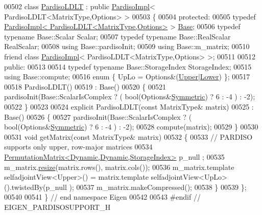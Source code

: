 \begin{DoxyCode}
00502 \textcolor{keyword}{class }\hyperlink{class_eigen_1_1_pardiso_l_d_l_t}{PardisoLDLT} : \textcolor{keyword}{public} \hyperlink{class_eigen_1_1_pardiso_impl}{PardisoImpl}< PardisoLDLT<MatrixType,Options> >
00503 \{
00504   \textcolor{keyword}{protected}:
00505     \textcolor{keyword}{typedef} \hyperlink{class_eigen_1_1_pardiso_impl}{PardisoImpl< PardisoLDLT<MatrixType,Options>} > 
      \hyperlink{group___sparse_core___module}{Base};
00506     \textcolor{keyword}{typedef} \textcolor{keyword}{typename} Base::Scalar Scalar;
00507     \textcolor{keyword}{typedef} \textcolor{keyword}{typename} Base::RealScalar RealScalar;
00508     \textcolor{keyword}{using} Base::pardisoInit;
00509     \textcolor{keyword}{using} Base::m\_matrix;
00510     \textcolor{keyword}{friend} \textcolor{keyword}{class }\hyperlink{class_eigen_1_1_pardiso_impl}{PardisoImpl}< PardisoLDLT<MatrixType,Options> >;
00511 
00512   \textcolor{keyword}{public}:
00513 
00514     \textcolor{keyword}{typedef} \textcolor{keyword}{typename} Base::StorageIndex StorageIndex;
00515     \textcolor{keyword}{using} Base::compute;
00516     \textcolor{keyword}{enum} \{ UpLo = Options&(\hyperlink{group__enums_gga39e3366ff5554d731e7dc8bb642f83cda6bcb58be3b8b8ec84859ce0c5ac0aaec}{Upper}|\hyperlink{group__enums_gga39e3366ff5554d731e7dc8bb642f83cda891792b8ed394f7607ab16dd716f60e6}{Lower}) \};
00517 
00518     PardisoLDLT()
00519       : Base()
00520     \{
00521       pardisoInit(Base::ScalarIsComplex ? ( \textcolor{keywordtype}{bool}(Options&\hyperlink{group__enums_gga39e3366ff5554d731e7dc8bb642f83cda7d30fb969ef6b763c098f0015108cef4}{Symmetric}) ? 6 : -4 ) : -2);
00522     \}
00523 
00524     \textcolor{keyword}{explicit} PardisoLDLT(\textcolor{keyword}{const} MatrixType& matrix)
00525       : Base()
00526     \{
00527       pardisoInit(Base::ScalarIsComplex ? ( \textcolor{keywordtype}{bool}(Options&\hyperlink{group__enums_gga39e3366ff5554d731e7dc8bb642f83cda7d30fb969ef6b763c098f0015108cef4}{Symmetric}) ? 6 : -4 ) : -2);
00528       compute(matrix);
00529     \}
00530     
00531     \textcolor{keywordtype}{void} getMatrix(\textcolor{keyword}{const} MatrixType& matrix)
00532     \{
00533       \textcolor{comment}{// PARDISO supports only upper, row-major matrices}
00534       \hyperlink{group___core___module}{PermutationMatrix<Dynamic,Dynamic,StorageIndex>} p\_null
      ;
00535       m\_matrix.\hyperlink{group___core___module_a0e0fda6e84d69e02432e4770359bb532}{resize}(matrix.rows(), matrix.cols());
00536       m\_matrix.template selfadjointView<Upper>() = matrix.template selfadjointView<UpLo>().twistedBy(p\_null
      );
00537       m\_matrix.makeCompressed();
00538     \}
00539 \};
00540 
00541 \} \textcolor{comment}{// end namespace Eigen}
00542 
00543 \textcolor{preprocessor}{#endif // EIGEN\_PARDISOSUPPORT\_H}
\end{DoxyCode}
